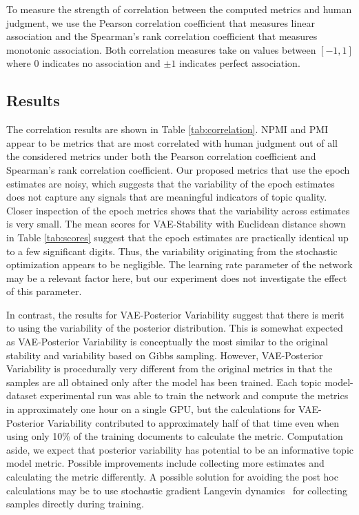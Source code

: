 \documentclass[10pt]{article}
\begin{document}
To measure the strength of correlation between the computed metrics and human judgment, we use the Pearson correlation coefficient that measures linear association and the Spearman's rank correlation coefficient that measures monotonic association. Both correlation measures take on values between $[-1,1]$ where $0$ indicates no association and $\pm1$ indicates perfect association.

\subsection{Results}\label{sec:results}

The correlation results are shown in Table \ref{tab:correlation}. NPMI and PMI appear to be metrics that are most correlated with human judgment out of all the considered metrics under both the Pearson correlation coefficient and Spearman's rank correlation coefficient. Our proposed metrics that use the epoch estimates are noisy, which suggests that the variability of the epoch estimates does not capture any signals that are meaningful indicators of topic quality. Closer inspection of the epoch metrics shows that the variability across estimates is very small. The mean scores for VAE-Stability with Euclidean distance shown in Table \ref{tab:scores} suggest that the epoch estimates are practically identical up to a few significant digits. Thus, the variability originating from the stochastic optimization appears to be negligible. The learning rate parameter of the network may be a relevant factor here, but our experiment does not investigate the effect of this parameter.

In contrast, the results for VAE-Posterior Variability suggest that there is merit to using the variability of the posterior distribution. This is somewhat expected as VAE-Posterior Variability is conceptually the most similar to the original stability and variability based on Gibbs sampling. However, VAE-Posterior Variability is procedurally very different from the original metrics in that the samples are all obtained only after the model has been trained. Each topic model-dataset experimental run was able to train the network and compute the metrics in approximately one hour on a single GPU, but the calculations for VAE-Posterior Variability contributed to approximately half of that time even when using only 10\% of the training documents to calculate the metric. Computation aside, we expect that posterior variability has potential to be an informative topic model metric. Possible improvements include collecting more estimates and calculating the metric differently. A possible solution for avoiding the post hoc calculations may be to use stochastic gradient Langevin dynamics~\cite{Welling:2011} for collecting samples directly during training.
\end{document}
